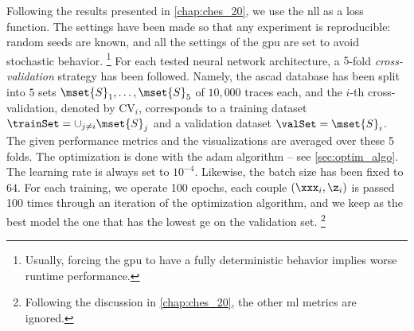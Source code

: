 Following the results presented in \autoref{chap:ches_20}, we use the \gls{nll} as a loss function.
The settings have been made so that any experiment is reproducible: random seeds are known, and all the settings of the \gls{gpu} are set to avoid stochastic behavior.%
\footnote{Usually, forcing the \gls{gpu} to have a fully deterministic behavior implies worse runtime performance.}
For each tested neural network architecture, a \(5\)-fold \emph{cross-validation} strategy has been followed. Namely, the \gls{ascad} database has been split into \(5\) sets \(\mset{S}_1, \ldots, \mset{S}_5\) of \(10,000\) traces each, and the \(i\)-th cross-validation, denoted by \(\mathrm{CV}_i\), corresponds to a training dataset \(\trainSet=\cup_{j\neq i} \mset{S}_j\) and a validation dataset \(\valSet = \mset{S}_i\).
The given performance metrics and the visualizations are averaged over these 5 folds. 
The optimization is done with the \gls{adam} algorithm -- see \autoref{sec:optim_algo}.
The learning rate is always set to \(10^{-4}\).
Likewise, the batch size has been fixed to \(64\).
For each training, we operate 100 epochs, \ie{} each couple \((\xxx_i, \z_i)\) is passed 100 times through an iteration of the optimization algorithm, and we keep as the best model the one that has the lowest \gls{ge} on the validation set.%
\footnote{
	Following the discussion in \autoref{chap:ches_20}, the other \gls{ml} metrics are ignored.
}